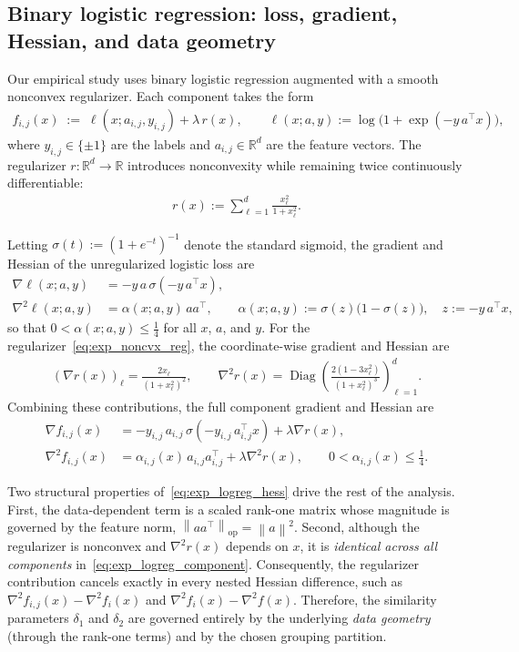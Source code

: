 \documentclass{article}
\newcommand{\bb}{\mathbb}
\newcommand{\op}{\operatorname{op}}
\newcommand{\R}{\bb R}
\newcommand{\sqn}[1]{\left\| #1 \right\|^2}
\newcommand{\opnorm}[1]{\left\| #1 \right\|_{\op}}      %
\newcommand{\eqdef}{:=}
\DeclareMathOperator{\Diag}{Diag}       %
\newcommand{\rb}[1]{\left(#1\right)}
\theoremstyle{plain}
\begin{document}
\subsection{Binary logistic regression: loss, gradient, Hessian, and data geometry}
\label{sec:exp_logreg_hessian}

Our empirical study uses binary logistic regression augmented with a smooth nonconvex regularizer. Each component takes the form
\begin{align}
\label{eq:exp_logreg_component}
f_{i,j}(x)
\;\eqdef\;
\ell(x;a_{i,j},y_{i,j}) + \lambda\, r(x),
\qquad
\ell(x;a,y)\eqdef \log\bigl(1+\exp(-y\,a^\top x)\bigr),
\end{align}
where $y_{i,j}\in\{\pm 1\}$ are the labels and $a_{i,j}\in\R^d$ are the feature vectors. The regularizer $r:\R^d\to\R$ introduces nonconvexity while remaining twice continuously differentiable:
\begin{align}
\label{eq:exp_noncvx_reg}
r(x)\eqdef \sum_{\ell=1}^d \frac{x_\ell^2}{1+x_\ell^2}.
\end{align}

Letting $\sigma(t)\eqdef (1+e^{-t})^{-1}$ denote the standard sigmoid, the gradient and Hessian of the unregularized logistic loss are
\begin{align}
\nabla \ell(x;a,y)
&= -y\,a\,\sigma(-y\,a^\top x),
\\
\nabla^2 \ell(x;a,y)
&= \alpha(x;a,y)\,a a^\top,
\qquad
\alpha(x;a,y)\eqdef \sigma(z)\bigl(1-\sigma(z)\bigr),
\quad
z\eqdef -y\,a^\top x,
\end{align}
so that $0<\alpha(x;a,y)\le \tfrac{1}{4}$ for all $x$, $a$, and $y$. For the regularizer~\eqref{eq:exp_noncvx_reg}, the coordinate-wise gradient and Hessian are
\begin{align}
\label{eq:exp_noncvx_reg_grad_hess}
\rb{\nabla r(x)}_\ell
= \frac{2x_\ell}{(1+x_\ell^2)^2},
\qquad
\nabla^2 r(x)
= \Diag\!\rb{\frac{2(1-3x_\ell^2)}{(1+x_\ell^2)^3}}_{\ell=1}^d.
\end{align}
Combining these contributions, the full component gradient and Hessian are
\begin{align}
\nabla f_{i,j}(x)
&= -y_{i,j}\,a_{i,j}\,\sigma(-y_{i,j}\,a_{i,j}^\top x) + \lambda \nabla r(x),
\\
\label{eq:exp_logreg_hess}
\nabla^2 f_{i,j}(x)
&= \alpha_{i,j}(x)\,a_{i,j}a_{i,j}^\top + \lambda \nabla^2 r(x),
\qquad
0<\alpha_{i,j}(x)\le \tfrac{1}{4}.
\end{align}

Two structural properties of~\eqref{eq:exp_logreg_hess} drive the rest of the analysis. First, the data-dependent term is a scaled rank-one matrix whose magnitude is governed by the feature norm, $\opnorm{a a^\top}=\sqn{a}$. Second, although the regularizer is nonconvex and $\nabla^2 r(x)$ depends on $x$, it is \emph{identical across all components} in~\eqref{eq:exp_logreg_component}. Consequently, the regularizer contribution cancels exactly in every nested Hessian difference, such as $\nabla^2 f_{i,j}(x)-\nabla^2 f_i(x)$ and $\nabla^2 f_i(x)-\nabla^2 f(x)$. Therefore, the similarity parameters $\delta_1$ and $\delta_2$ are governed entirely by the underlying \emph{data geometry} (through the rank-one terms) and by the chosen grouping partition.
\end{document}
